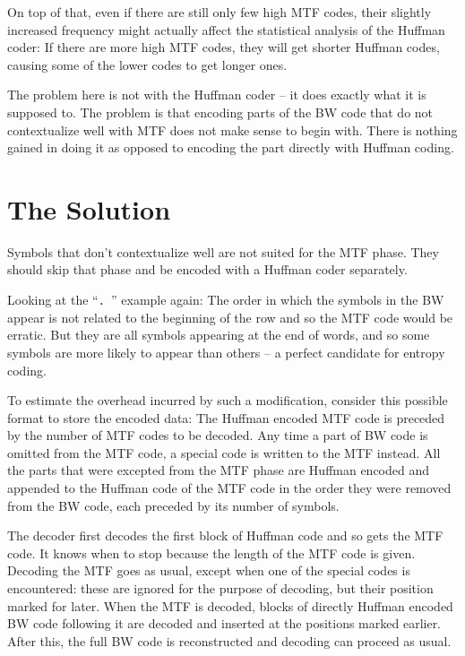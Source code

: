 \documentclass[a4paper]{scrreprt}
\begin{document}
On top of that, even if there are still only few high MTF codes, their slightly
increased frequency might actually affect the statistical analysis of the
Huffman coder: If there are more high MTF codes, they will get shorter Huffman
codes, causing some of the lower codes to get longer ones.

The problem here is not with the Huffman coder -- it does exactly what it is
supposed to. The problem is that encoding parts of the BW code that do not
contextualize well with MTF does not make sense to begin with. There is nothing
gained in doing it as opposed to encoding the part directly with Huffman coding.

\section{The Solution}

Symbols that don't contextualize well are not suited for the MTF phase. They
should skip that phase and be encoded with a Huffman coder separately.

Looking at the ``\texttt{. }'' example again: The order in which the symbols in
the BW appear is not related to the beginning of the row and so the MTF code
would be erratic. But they are all symbols appearing at the end of words, and so
some symbols are more likely to appear than others -- a perfect candidate for
entropy coding.

To estimate the overhead incurred by such a modification, consider this possible
format to store the encoded data: The Huffman encoded MTF code is preceded by
the number of MTF codes to be decoded. Any time a part of BW code is omitted
from the MTF code, a special code is written to the MTF instead. All the parts
that were excepted from the MTF phase are Huffman encoded and appended to the
Huffman code of the MTF code in the order they were removed from the BW code,
each preceded by its number of symbols.

The decoder first decodes the first block of Huffman code and so gets the MTF
code. It knows when to stop because the length of the MTF code is given.
Decoding the MTF goes as usual, except when one of the special codes is
encountered: these are ignored for the purpose of decoding, but their position
marked for later. When the MTF is decoded, blocks of directly Huffman encoded BW
code following it are decoded and inserted at the positions marked earlier.
After this, the full BW code is reconstructed and decoding can proceed as usual.
\end{document}
